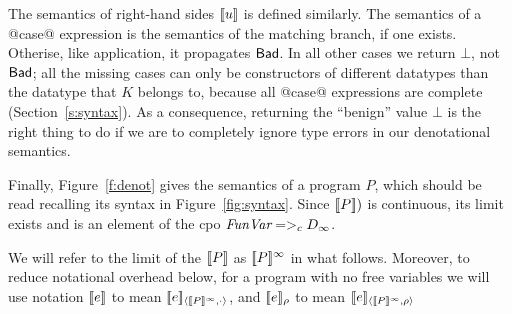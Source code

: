 The semantics of right-hand sides $[\![u]\!]$ is defined similarly.  The
semantics of a @case@ expression is the semantics of the matching branch,
if one exists. Otherise, like application, it propagates $\mathsf{Bad}$.
In all other cases we return $\bot$, not $\mathsf{Bad}$;
all the missing cases can only be constructors
of different datatypes than the datatype that $K$ belongs to, because
all @case@ expressions are complete (Section~\ref{s:syntax}).  As a
consequence, returning the ``benign'' value $\bot$ is the right thing
to do if we are to completely ignore type errors in our denotational
semantics. 

Finally, Figure~\ref{f:denot} gives the semantics of a program $P$, which should
be read recalling its syntax in Figure~\ref{fig:syntax}.
Since $[\![P]\!])$ is continuous, its limit exists and is an element of the
cpo $\textit{FunVar} =>_c D_{\infty}$.

\begin{definition}
We will refer to the limit of the $[\![P]\!]$ as $[\![P]\!]^{\infty}$ in what follows.
Moreover, to reduce notational overhead below, for a program with no free variables we
will use notation $[\![e]\!]$ to mean $[\![e]\!]_{\langle {[\![P]\!]^\infty},{\cdot}\rangle}$, and
$[\![e]\!]_\rho$ to mean $[\![e]\!]_{\langle {[\![P]\!]^\infty},{\rho}\rangle}$
\end{definition}

